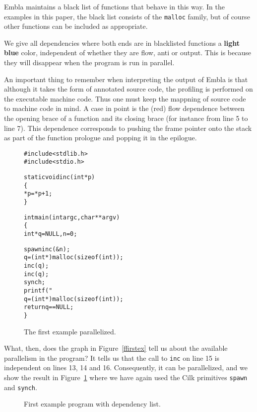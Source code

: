 Embla maintains a black list of functions that behave in this way.
In the examples in this paper, the black list consists of the 
{\tt malloc} family, but of course other functions can be included 
as appropriate. 

We give all dependencies where both ends are in blacklisted functions 
a {\bf \color{cyan}light blue} color, independent of whether they are 
flow, anti or output. This is because they will disappear when the
program is run in parallel.

An important thing to remember when interpreting the output of Embla 
is that although it takes the form of annotated source code, the 
profiling is performed on the executable machine code. Thus one must
keep the mappning of source code to machine code in mind. A case in 
point is the (red) flow dependence between the opening brace of a 
function and its closing brace (for instance from line 5 to line 7).
This dependence corresponds to pushing the frame pointer onto the 
stack as part of the function prologue and popping it in the 
epilogue.

\begin{figure}
\small
\hrulefill
\begin{alltt}
#include <stdlib.h>
#include <stdio.h>

static void inc(int *p)
\verb+{+
   *p=*p+1;
\verb+}+

int main(int argc, char **argv)
\verb+{+
   int *q=NULL,n=0;

   {\color{red}spawn} inc(&n);
   q = (int*) malloc( sizeof(int) );
   inc(q);
   inc(q);
   {\color{red}synch;}
   printf( "%d\verb+\+n", *q+n );
   q = (int*) malloc( sizeof(int) );
   return q==NULL;
\verb+}+
\end{alltt}
\hrulefill
\caption{The first example parallelized.}
\label{fparfirstex}
\end{figure}

What, then, does the graph in Figure~\ref{ffirstex} tell us about
the available parallelism in the program? It tells us that 
the call to {\tt inc} on line 15 is independent on lines 13, 14
and 16. Consequently, it can be parallelized, and we show the
result in Figure~\ref{fparfirstex} where we have again used the 
Cilk primitives {\tt spawn} and {\tt synch}.

\begin{figure} 
\small

\caption{First example program with dependency list.}
\label{ffirstexlist}
\end{figure}

